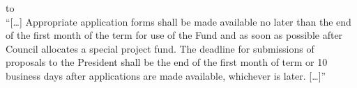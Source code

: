 \documentclass[12pt, letterpaper]{article}
\begin{document}
to\\

“[…] Appropriate application forms shall be made available no later than the end of the first month of the term for use of the Fund and as soon as possible after Council allocates a special project fund. The deadline for submissions of proposals to the President shall be the end of the first month of term or 10 business days after applications are made available, whichever is later. […]”\\
\end{document}
